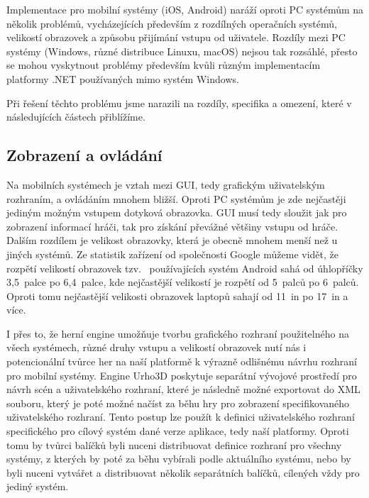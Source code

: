 Implementace pro mobilní systémy (iOS, Android) naráží oproti PC systémům na několik problémů, vycházejících především z rozdílných operačních systémů, velikostí obrazovek a způsobu přijímání vstupu od uživatele. Rozdíly mezi PC systémy (Windows, různé distribuce Linuxu, macOS) nejsou tak rozsáhlé, přesto se mohou vyskytnout problémy především kvůli různým implementacím platformy .NET používaných mimo systém Windows.

Při řešení těchto problému jsme narazili na rozdíly, specifika a omezení, které v následujících částech přiblížíme.

\subsection{Zobrazení a ovládání}
Na mobilních systémech je vztah mezi GUI, tedy grafickým uživatelským rozhraním, a ovládáním mnohem bližší. Oproti PC systémům je zde nejčastěji jediným možným vstupem dotyková obrazovka. GUI musí tedy sloužit jak pro zobrazení informací hráči, tak pro získání převážné většiny vstupu od hráče. Dalším rozdílem je velikost obrazovky, která je obecně mnohem menší než u jiných systémů. Ze statistik zařízení od společnosti Google \citep{site:materialdesign} můžeme vidět, že rozpětí velikostí obrazovek tzv.~ používajících systém Android sahá od úhlopříčky 3,5~palce po 6,4~palce, kde nejčastější velikostí je rozpětí od 5~palců po 6~palců. Oproti tomu nejčastější velikosti obrazovek laptopů sahají od 11~in po 17~in a více. 

I přes to, že herní engine umožňuje tvorbu grafického rozhraní použitelného na všech systémech, různé druhy vstupu a velikostí obrazovek nutí nás i potencionální tvůrce her na naší platformě k výrazně odlišnému návrhu rozhraní pro mobilní systémy. Engine Urho3D poskytuje separátní vývojové prostředí pro návrh scén a uživatelského rozhraní, které je následně možné exportovat do XML souboru, který je poté možné načíst za běhu hry pro zobrazení specifikovaného uživatelského rozhraní. Tento postup lze použít k definici uživatelského rozhraní specifického pro cílový systém dané verze aplikace, tedy naší platformy. Oproti tomu by tvůrci balíčků byli nuceni distribuovat definice rozhraní pro všechny systémy, z kterých by poté za běhu vybírali podle aktuálního systému, nebo by byli nuceni vytvářet a distribuovat několik separátních balíčků, cílených vždy pro jediný systém. 

